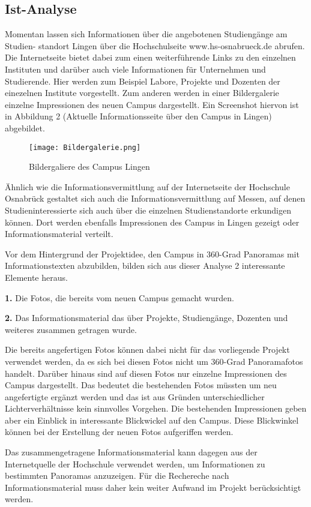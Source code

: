 \subsection{Ist-Analyse}
\label{sec:IstAnalyse}

Momentan lassen sich Informationen über die angebotenen Studiengänge am Studien-
standort Lingen über die Hochschulseite www.hs-osnabrueck.de abrufen. Die Internetseite bietet dabei zum einen 
weiterführende Links zu den einzelnen Instituten und darüber auch viele Informationen für Unternehmen und Studierende.
Hier werden zum Beispiel Labore, Projekte und Dozenten der einezelnen Institute vorgestellt. Zum anderen werden in einer 
Bildergalerie einzelne Impressionen des neuen Campus dargestellt. Ein Screenshot hiervon ist in Abbildung 2 (Aktuelle 
Informationsseite über den Campus in Lingen) abgebildet.

\begin{figure}[htb]
\centering
\texttt{[image: Bildergalerie.png]}
\caption[Campus Lingen Bildergalerie]{Bildergaliere des Campus Lingen\protect\footnotemark}
\label{fig:Architektur}
\end{figure}

Ähnlich wie die Informationsvermittlung auf der Internetseite der Hochschule Osnabrück
gestaltet sich auch die Informationsvermittlung auf Messen, auf denen Studieninteressierte
sich auch über die einzelnen Studienstandorte erkundigen können. Dort werden ebenfalls
Impressionen des Campus in Lingen gezeigt oder Informationsmaterial verteilt.

Vor dem Hintergrund der Projektidee, den Campus in 360-Grad Panoramas mit Informationstexten abzubilden, bilden sich aus 
dieser Analyse 2 interessante Elemente heraus.

\textbf{1.} Die Fotos, die bereits vom neuen Campus gemacht wurden.

\textbf{2.} Das Informationsmaterial das über Projekte, Studiengänge, Dozenten und weiteres zusammen getragen wurde.

Die bereits angefertigen Fotos können dabei nicht für das vorliegende Projekt verwendet werden, da es sich bei diesen 
Fotos nicht um 360-Grad Panoramafotos handelt. Darüber hinaus sind auf diesen Fotos nur einzelne Impressionen des Campus 
dargestellt. Das bedeutet die bestehenden Fotos müssten um neu angefertigte ergänzt werden und das ist aus Gründen 
unterschiedlicher Lichterverhältnisse kein sinnvolles Vorgehen. Die bestehenden Impressionen geben aber ein Einblick in 
interessante Blickwickel auf den Campus. Diese Blickwinkel können bei der Erstellung der neuen Fotos aufgeriffen werden. 

Das zusammengetragene Informationsmaterial kann dagegen aus der Internetquelle der Hochschule verwendet werden, um 
Informationen zu bestimmten Panoramas anzuzeigen. Für die Rechereche nach Informationsmaterial muss daher kein weiter 
Aufwand im Projekt berücksichtigt werden.